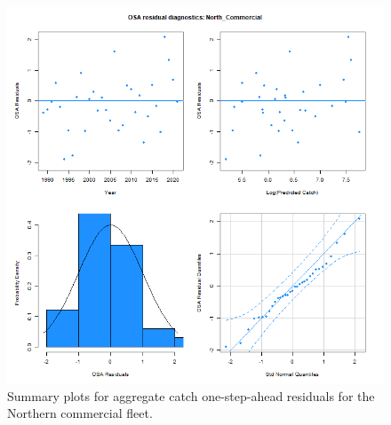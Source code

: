 \documentclass[
]{article}
\begin{document}
\begin{figure}

{\centering \includegraphics[width=1\linewidth]{../2023.RT.Runs/Run34/plots_png/diagnostics/OSA_resid_catch_4panel_North_Commercial} 

}

\caption{Summary plots for aggregate catch one-step-ahead residuals for the Northern commercial fleet.}\label{fig:osa-North-comm-catch-summ}
\end{figure}
\end{document}
